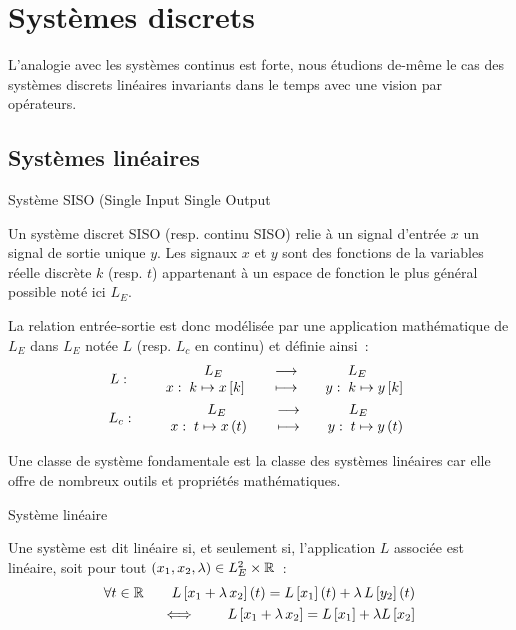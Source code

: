 \chapter{Systèmes discrets}


L'analogie avec les systèmes continus est forte, nous étudions de-même
le cas des systèmes discrets linéaires invariants dans le temps avec
une vision par opérateurs.


\section{Systèmes linéaires}

\begin{definition}{Système SISO (Single Input Single Output}
  
  Un système discret SISO (resp. continu SISO) relie à un signal d'entrée $x$
  un signal de sortie unique $y$. Les signaux $x$ et $y$ sont des
  fonctions de la variables réelle discrète $k$ (resp. $t$) appartenant
  à un espace de fonction le plus général possible noté ici $L_E$.

  La relation entrée-sortie est donc modélisée par une application
  mathématique de $L_E$ dans $L_E$ notée $L$ (resp. $L_c$ en continu)
  et définie ainsi~:
  \begin{eqnarray}
    L : \qquad \begin{array}{ccc} L_E & \longrightarrow & L_E \\ x : \; k\mapsto x\left[k\right]\quad{} & \longmapsto & \quad y :\; k\mapsto y\left[k\right] \\ \end{array} \\
    L_c: \qquad \begin{array}{ccc} L_E & \longrightarrow & L_E \\ x : \; t\mapsto x\left(t\right)\quad{} & \longmapsto & \quad y :\; t\mapsto y\left(t\right) \\ \end{array} 
  \end{eqnarray}
\end{definition}

Une classe de système fondamentale est la classe des systèmes
linéaires car elle offre de nombreux outils et propriétés
mathématiques.

\begin{definition}{Système linéaire}
  \label{def:linearite}
  
  Une système est dit linéaire si, et seulement si, l'application $L$
  associée est linéaire, soit pour tout
  $\left(x_1,x_2,\lambda\right) \in L_E^2 \times \mathbb{R}$~:
  \begin{eqnarray}
    \label{eq:def_linearite}
    \forall t \in \mathbb{R} \qquad L\left[x_1 + \lambda\, x_2\right](t) = L\left[x_1\right](t) + \lambda\,L\left[y_2\right](t) \nonumber\\
    \iff \qquad L\left[x_1 + \lambda\,x_2\right] = L\left[x_1\right] +\lambda L\left[x_2 \right]
  \end{eqnarray}
\end{definition}

